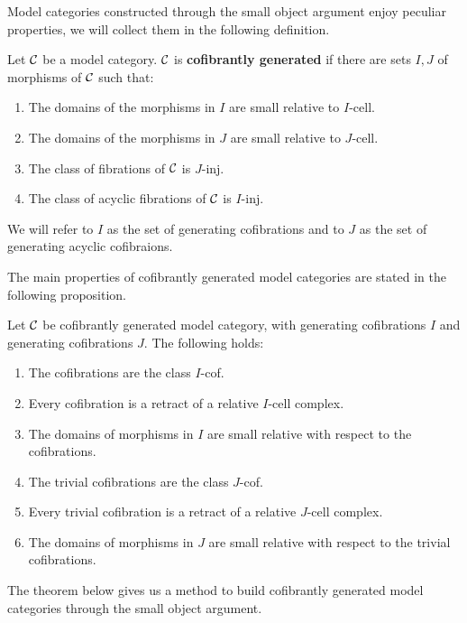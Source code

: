 Model categories constructed through the small object argument enjoy peculiar properties, we will collect them in the following definition.

\begin{definition}
	Let $\mathcal{C}$ be a model category. $\mathcal{C}$ is \textbf{cofibrantly generated} if there are sets $I,J$ of morphisms of $\mathcal{C}$ such that:
	\begin{enumerate}
		\item The domains of the morphisms in $I$ are small relative to $I$-cell.
		\item The domains of the morphisms in $J$ are small relative to $J$-cell.
		\item The class of fibrations of $\mathcal{C}$ is $J$-inj.
		\item The class of acyclic fibrations of $\mathcal{C}$ is $I$-inj. 
	\end{enumerate}
	We will refer to $I$ as the set of generating cofibrations and to $J$ as the set of generating acyclic cofibraions.
\end{definition}

The main properties of cofibrantly generated model categories are stated in the following proposition.

\begin{proposition}
	Let $\mathcal{C}$ be cofibrantly generated model category, with generating cofibrations $I$ and generating cofibrations $J$. The following holds:
	\begin{enumerate}
		\item The cofibrations are the class $I$-cof.
		\item Every cofibration is a retract of a relative $I$-cell complex.
		\item The domains of morphisms in $I$ are small relative with respect to the cofibrations.
		\item The trivial cofibrations are the class $J$-cof.
		\item Every  trivial cofibration is a retract of a relative $J$-cell complex.
		\item The domains of morphisms in $J$ are small relative with respect to the trivial cofibrations.
	\end{enumerate}
\end{proposition}

The theorem below gives us a method to build cofibrantly generated model categories through the small object argument.

